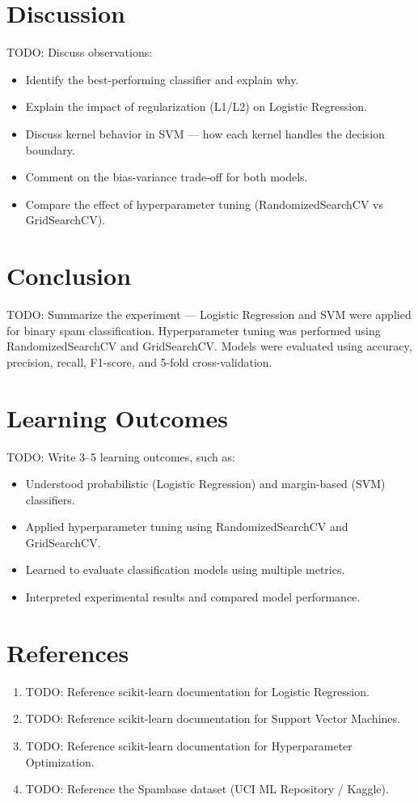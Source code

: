 \documentclass[12pt,a4paper]{article}
\begin{document}
\section{Discussion}
TODO: Discuss observations:
\begin{itemize}
    \item Identify the best-performing classifier and explain why.
    \item Explain the impact of regularization (L1/L2) on Logistic Regression.
    \item Discuss kernel behavior in SVM — how each kernel handles the decision boundary.
    \item Comment on the bias-variance trade-off for both models.
    \item Compare the effect of hyperparameter tuning (RandomizedSearchCV vs GridSearchCV).
\end{itemize}

\section{Conclusion}
TODO: Summarize the experiment — Logistic Regression and SVM were applied for binary spam classification. Hyperparameter tuning was performed using RandomizedSearchCV and GridSearchCV. Models were evaluated using accuracy, precision, recall, F1-score, and 5-fold cross-validation.

\section{Learning Outcomes}
TODO: Write 3–5 learning outcomes, such as:
\begin{itemize}
    \item Understood probabilistic (Logistic Regression) and margin-based (SVM) classifiers.
    \item Applied hyperparameter tuning using RandomizedSearchCV and GridSearchCV.
    \item Learned to evaluate classification models using multiple metrics.
    \item Interpreted experimental results and compared model performance.
\end{itemize}

\section{References}
\begin{enumerate}
    \item TODO: Reference scikit-learn documentation for Logistic Regression.
    \item TODO: Reference scikit-learn documentation for Support Vector Machines.
    \item TODO: Reference scikit-learn documentation for Hyperparameter Optimization.
    \item TODO: Reference the Spambase dataset (UCI ML Repository / Kaggle).
\end{enumerate}
\end{document}
